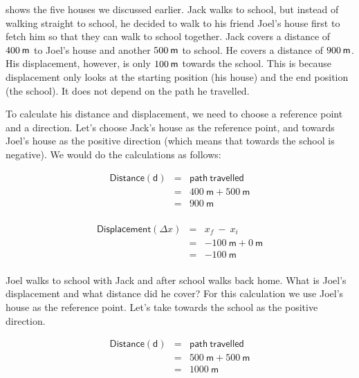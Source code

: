 \label{m38788*id62109} shows the five houses we discussed earlier. Jack walks to school, but instead of walking straight to school, he decided to walk to his friend Joel's house first to fetch him so that they can walk to school together. Jack covers a distance of $400\phantom{\rule{2pt}{0ex}}\mathsf{m}$ to Joel's house and another $500\phantom{\rule{2pt}{0ex}}\mathsf{m}$ to school. He covers a distance of $900\phantom{\rule{2pt}{0ex}}\mathsf{m}$. His displacement, however, is only $100\phantom{\rule{2pt}{0ex}}\mathsf{m}$ towards the school. This is because displacement only looks at the starting position (his house) and the end position (the school). It does not depend on the path he travelled.\par 
\label{m38788*id62121}To calculate his distance and displacement, we need to choose a reference point and a direction. Let's choose Jack's house as the reference point, and towards Joel's house as the positive direction (which means that towards the school is negative). We would do the calculations as follows:\\
\begin{minipage}{0.5\textwidth}
\begin{eqnarray*}
\mathsf{Distance (d)} &=& \mathsf{path~travelled}\\
&=&400\ \mathsf{m} + 500\ \mathsf{m}\\
&=&900\ \mathsf{m}\\
\end{eqnarray*}
\end{minipage}
\begin{minipage}{0.5\textwidth}
\begin{eqnarray*}
\mathsf{Displacement} (\Delta x) &=& x_f~ - ~ x_i\\
&=&-100\ \mathsf{m} + 0\ \mathsf{m}\\
&=&-100\ \mathsf{m}\\
\end{eqnarray*}
\end{minipage}
      \label{m38788*eip-883}
      \label{m38788*id63667}Joel walks to school with Jack and after school walks back home. What is Joel's displacement and what distance did he cover?
For this calculation we use Joel's house as the reference point. Let's take towards the school as the positive direction.\\
\begin{minipage}{0.5\textwidth}
\begin{eqnarray*}
\mathsf{Distance (d)} &=& \mathsf{path~travelled}\\
&=&500\ \mathsf{m} + 500\ \mathsf{m}\\
&=&1000\ \mathsf{m}
\end{eqnarray*}
\end{minipage}
